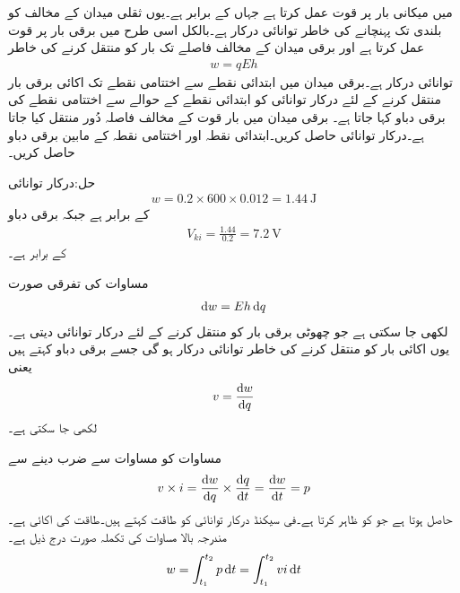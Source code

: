  میں میکانی بار  پر قوت  عمل کرتا ہے جہاں  کے برابر ہے۔یوں ثقلی میدان کے مخالف  کو  بلندی تک پہنچانے کی خاطر  توانائی درکار ہے۔بالکل اسی طرح   میں برقی بار  پر  قوت عمل کرتا ہے اور برقی میدان کے مخالف  فاصلے تک بار کو منتقل کرنے کی خاطر 
\begin{align}\label{مساوات_بنیادی_توانائی_دباو}
w=q E h
\end{align}
توانائی درکار ہے۔برقی میدان میں ابتدائی نقطے سے اختتامی نقطے تک اکائی برقی بار منتقل کرنے کے لئے درکار توانائی کو ابتدائی نقطے کے حوالے سے اختتامی نقطے کی برقی دباو کہا جاتا ہے۔
برقی میدان  میں  بار قوت کے مخالف  فاصلہ دُور منتقل کیا جاتا ہے۔درکار توانائی حاصل کریں۔ابتدائی نقطہ  اور اختتامی نقطہ  کے مابین برقی دباو حاصل کریں۔

حل:درکار توانائی
\begin{align*}
w=0.2 \times 600 \times 0.012=\SI{1.44}{\joule}
\end{align*}
کے برابر ہے جبکہ برقی دباو
\begin{align*}
V_{ki}=\frac{1.44}{0.2}=\SI{7.2}{\volt}
\end{align*}
کے برابر ہے۔

مساوات  کی تفرقی صورت 
\begin{align*}
\dif w= E h \dif q
\end{align*}
لکھی جا سکتی ہے جو چھوٹی برقی بار  کو منتقل کرنے کے لئے درکار توانائی  دیتی ہے۔یوں اکائی بار کو منتقل کرنے کی خاطر  توانائی درکار ہو گی جسے برقی دباو  کہتے ہیں یعنی
\begin{align}\label{مساوات_بنیادی_دباو_تعریف}
v=\frac{\dif w}{\dif q}
\end{align}
لکھی جا سکتی ہے۔

مساوات  کو مساوات  سے ضرب دینے سے
\begin{align}\label{مساوات_بنیادی_طاقت_مساوی_دباو_ضرب_رو}
v \times i = \frac{\dif w}{\dif q} \times \frac{\dif q}{\dif t}=\frac{\dif w}{\dif t}=p
\end{align}
حاصل ہوتا ہے جو   کو ظاہر کرتا ہے۔فی سیکنڈ درکار توانائی کو طاقت کہتے ہیں۔طاقت کی اکائی   ہے۔مندرجہ بالا مساوات کی تکملہ صورت درج ذیل ہے۔
\begin{align}
w=\int_{t_1}^{t_2} p \dif t=\int_{t_1}^{t_2} v i\dif t
\end{align}

